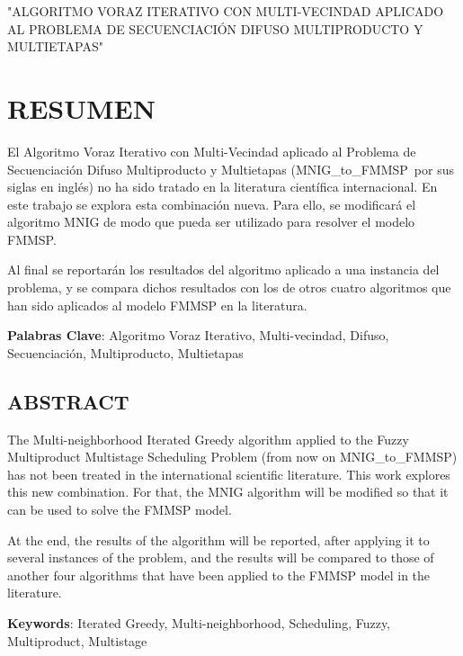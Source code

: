 \documentclass{article}
\def\algmod{MNIG\_to\_FMMSP} %
\begin{document}
"ALGORITMO VORAZ ITERATIVO CON MULTI-VECINDAD APLICADO AL PROBLEMA DE SECUENCIACIÓN DIFUSO MULTIPRODUCTO Y \linebreak MULTIETAPAS"

\newpage

\section{RESUMEN}

El Algoritmo Voraz Iterativo con Multi-Vecindad aplicado al Problema de Secuenciación Difuso Multiproducto y Multietapas (\algmod\ por sus siglas en inglés) no ha sido tratado en la literatura científica internacional. En este trabajo se explora esta combinación nueva. Para ello, se modificará el algoritmo MNIG de modo que pueda ser utilizado para resolver el modelo FMMSP.

\vspace{\baselineskip}
Al final se reportarán los resultados del algoritmo aplicado a una instancia del problema, y se compara dichos resultados con los de otros cuatro algoritmos que han sido aplicados al modelo FMMSP en la literatura.

\vspace{\baselineskip}
\textbf{Palabras Clave}: Algoritmo Voraz Iterativo, Multi-vecindad, Difuso, Secuenciación, Multiproducto, Multietapas

\subsection{ABSTRACT}

The Multi-neighborhood Iterated Greedy algorithm applied to the Fuzzy Multiproduct Multistage Scheduling Problem (from now on \algmod) has not been treated in the international scientific literature. This work explores this new combination. For that, the MNIG algorithm will be modified so that it can be used to solve the FMMSP model.

\vspace{\baselineskip}
At the end, the results of the algorithm will be reported, after applying it to several instances of the problem, and the results will be compared to those of another four algorithms that have been applied to the FMMSP model in the literature. 

\vspace{\baselineskip}
\par \textbf{Keywords}: Iterated Greedy, Multi-neighborhood, Scheduling, Fuzzy, Multiproduct, Multistage
\end{document}
